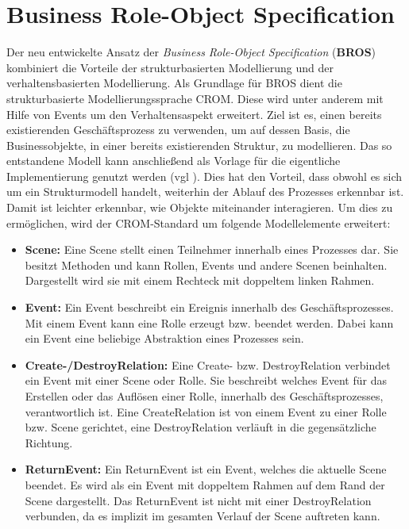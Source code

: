\section{Business Role-Object Specification}

Der neu entwickelte Ansatz der \emph{Business Role-Object Specification} (\textbf{BROS}) kombiniert die Vorteile der strukturbasierten Modellierung und der verhaltensbasierten Modellierung.
Als Grundlage für BROS dient die strukturbasierte Modellierungssprache CROM.
Diese wird unter anderem mit Hilfe von Events um den Verhaltensaspekt erweitert.
Ziel ist es, einen bereits existierenden Geschäftsprozess zu verwenden, um auf dessen Basis, die Businessobjekte, in einer bereits existierenden Struktur, zu modellieren.
Das so entstandene Modell kann anschließend als Vorlage für die eigentliche Implementierung genutzt werden (vgl \cite{Schoen}).
Dies hat den Vorteil, dass obwohl es sich um ein Strukturmodell handelt, weiterhin der Ablauf des Prozesses erkennbar ist.
Damit ist leichter erkennbar, wie Objekte miteinander interagieren.
Um dies zu ermöglichen, wird der CROM-Standard um folgende Modellelemente erweitert:

\begin{itemize}
    \item \textbf{Scene:}
    Eine Scene stellt einen Teilnehmer innerhalb eines Prozesses dar.
    Sie besitzt Methoden und kann Rollen, Events und andere Scenen beinhalten.
    Dargestellt wird sie mit einem Rechteck mit doppeltem linken Rahmen.
    \item \textbf{Event:}
    Ein Event beschreibt ein Ereignis innerhalb des Geschäftsprozesses.
    Mit einem Event kann eine Rolle erzeugt bzw. beendet werden.
    Dabei kann ein Event eine beliebige Abstraktion eines Prozesses sein.
    \item \textbf{Create-/DestroyRelation:}
    Eine Create- bzw. DestroyRelation verbindet ein Event mit einer Scene oder Rolle.
    Sie beschreibt welches Event für das Erstellen oder das Auflösen einer Rolle, innerhalb des Geschäftsprozesses, verantwortlich ist.
    Eine CreateRelation ist von einem Event zu einer Rolle bzw. Scene gerichtet, eine DestroyRelation verläuft in die gegensätzliche Richtung.
    \item \textbf{ReturnEvent:}
    Ein ReturnEvent ist ein Event, welches die aktuelle Scene beendet.
    Es wird als ein Event mit doppeltem Rahmen auf dem Rand der Scene dargestellt.
    Das ReturnEvent ist nicht mit einer DestroyRelation verbunden, da es implizit im gesamten Verlauf der Scene auftreten kann.
\end{itemize}

